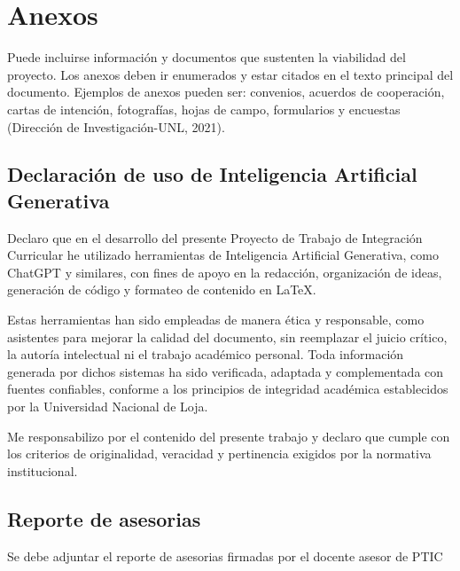 

\clearpage
\section{Anexos}
Puede incluirse información y documentos que sustenten la viabilidad del proyecto. Los anexos deben ir enumerados y estar citados en el texto principal del documento. Ejemplos de anexos pueden ser: convenios, acuerdos de cooperación, cartas de intención, fotografías, hojas de campo, formularios y encuestas (Dirección de Investigación-UNL, 2021).
\subsection{Declaración de uso de Inteligencia Artificial Generativa}

Declaro que en el desarrollo del presente Proyecto de Trabajo de Integración Curricular he utilizado herramientas de Inteligencia Artificial Generativa, como ChatGPT y similares, con fines de apoyo en la redacción, organización de ideas, generación de código y formateo de contenido en LaTeX.

Estas herramientas han sido empleadas de manera ética y responsable, como asistentes para mejorar la calidad del documento, sin reemplazar el juicio crítico, la autoría intelectual ni el trabajo académico personal. Toda información generada por dichos sistemas ha sido verificada, adaptada y complementada con fuentes confiables, conforme a los principios de integridad académica establecidos por la Universidad Nacional de Loja.

Me responsabilizo por el contenido del presente trabajo y declaro que cumple con los criterios de originalidad, veracidad y pertinencia exigidos por la normativa institucional.
\clearpage





%



\clearpage
\subsection{Reporte de asesorias}
Se debe adjuntar el reporte de asesorias firmadas por el docente asesor de PTIC